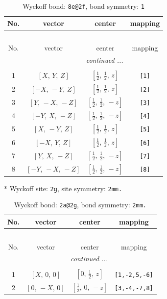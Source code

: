 \documentclass[fleqn,8pt]{jsarticle}
\begin{document}
\begin{longtable}{cccc}
\caption{Wyckoff bond: {\tt 8e@2f}, bond symmetry: {\tt 1}}
 \\
 \hline \hline
No. & vector & center & mapping \\ \hline \endfirsthead

\multicolumn{3}{l}{\tablename\ \thetable{}} \\
 \hline \hline
No. & vector & center & mapping \\ \hline \endhead

 \hline \hline
\multicolumn{3}{r}{\footnotesize\it continued ...} \\ \endfoot

 \hline \hline
\multicolumn{3}{r}{} \\ \endlastfoot

1 & $\left[ X,\, Y,\, Z \right]$ & $\left[ \frac{1}{2},\, \frac{1}{2},\, z \right]$ & {\tt [1]} \\ \hline
2 & $\left[ - X,\, - Y,\, Z \right]$ & $\left[ \frac{1}{2},\, \frac{1}{2},\, z \right]$ & {\tt [2]} \\ \hline
3 & $\left[ Y,\, - X,\, - Z \right]$ & $\left[ \frac{1}{2},\, \frac{1}{2},\, - z \right]$ & {\tt [3]} \\ \hline
4 & $\left[ - Y,\, X,\, - Z \right]$ & $\left[ \frac{1}{2},\, \frac{1}{2},\, - z \right]$ & {\tt [4]} \\ \hline
5 & $\left[ X,\, - Y,\, Z \right]$ & $\left[ \frac{1}{2},\, \frac{1}{2},\, z \right]$ & {\tt [5]} \\ \hline
6 & $\left[ - X,\, Y,\, Z \right]$ & $\left[ \frac{1}{2},\, \frac{1}{2},\, z \right]$ & {\tt [6]} \\ \hline
7 & $\left[ Y,\, X,\, - Z \right]$ & $\left[ \frac{1}{2},\, \frac{1}{2},\, - z \right]$ & {\tt [7]} \\ \hline
8 & $\left[ - Y,\, - X,\, - Z \right]$ & $\left[ \frac{1}{2},\, \frac{1}{2},\, - z \right]$ & {\tt [8]} \\
\end{longtable}
* Wyckoff site: {\tt 2g}, site symmetry: {\tt 2mm.}
\renewcommand{\arraystretch}{1.2}
\begin{longtable}{cccc}
\caption{Wyckoff bond: {\tt 2a@2g}, bond symmetry: {\tt 2mm.}}
 \\
 \hline \hline
No. & vector & center & mapping \\ \hline \endfirsthead

\multicolumn{3}{l}{\tablename\ \thetable{}} \\
 \hline \hline
No. & vector & center & mapping \\ \hline \endhead

 \hline \hline
\multicolumn{3}{r}{\footnotesize\it continued ...} \\ \endfoot

 \hline \hline
\multicolumn{3}{r}{} \\ \endlastfoot

1 & $\left[ X,\, 0,\, 0 \right]$ & $\left[ 0,\, \frac{1}{2},\, z \right]$ & {\tt [1,-2,5,-6]} \\ \hline
2 & $\left[ 0,\, - X,\, 0 \right]$ & $\left[ \frac{1}{2},\, 0,\, - z \right]$ & {\tt [3,-4,-7,8]} \\
\end{longtable}
\end{document}
